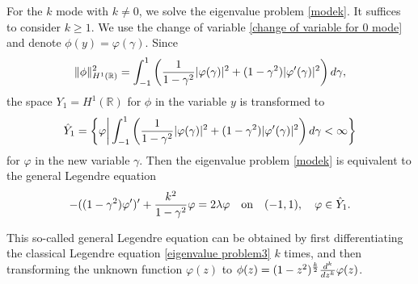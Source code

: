 \documentclass[1 [leqno, 11pt]{amsart}
\numberwithin{equation}{section}
\begin{document}
\begin{CJK*}{GBK}{song}
For the $k$ mode with $k\neq0$, we solve the eigenvalue problem
\eqref{modek}.
It suffices to consider $k\geq1$. We use the change of variable  \eqref{change of variable for 0 mode}
 and denote $\phi(y)=\varphi(\gamma)$.
Since $$\|\phi\|_{H^1(\mathbb{R})}^2=\int_{-1}^1\left({1\over1-\gamma^2}|\varphi(\gamma)|^2+(1-\gamma^2)|\varphi'(\gamma)|^2\right)d\gamma,$$
the space $Y_1=H^1(\mathbb{R})$ for $\phi$ in the variable $y$ is transformed to
\begin{align}\label{def-hat-Y1}
\hat Y_1=\left\{\varphi\bigg|\int_{-1}^1\left({1\over1-\gamma^2}|\varphi(\gamma)|^2+(1-\gamma^2)|\varphi'(\gamma)|^2\right)d\gamma<\infty \right\}
\end{align}
for $\varphi$ in the new variable $\gamma$. Then the eigenvalue problem \eqref{modek}  is equivalent to the general Legendre equation
\begin{equation}\label{eigenvalue problem2 non-zero modes varepsilon=0}
-((1-\gamma^2)\varphi')'+{k^2\over1-\gamma^2}\varphi =2\lambda\varphi \quad \text{on}\quad (-1,1),\quad\varphi\in \hat Y_1.
\end{equation}

This so-called   general Legendre equation can be obtained by first differentiating the classical Legendre equation \eqref{eigenvalue problem3} $k$ times, and then transforming  the unknown function $\varphi(z)$ to $\phi(z)=(1-z^2)^{k\over2}{d^k\over dz^k}\varphi(z)$.
\fi


\end{CJK*}
\end{document}
